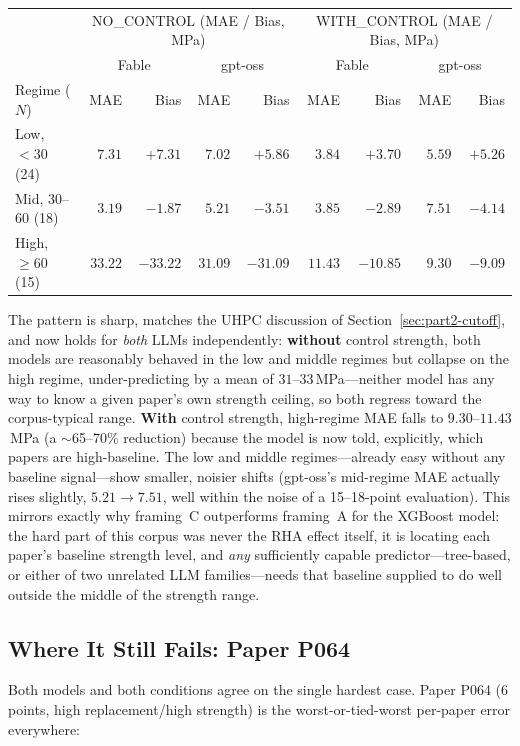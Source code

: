\documentclass[11pt]{article}
\begin{document}
\begin{center}\footnotesize
\begin{tabular}{lrrrrrrrr}
\toprule
& \multicolumn{4}{c}{NO\_CONTROL (MAE / Bias, MPa)} & \multicolumn{4}{c}{WITH\_CONTROL (MAE / Bias, MPa)} \\
& \multicolumn{2}{c}{Fable} & \multicolumn{2}{c}{gpt-oss} & \multicolumn{2}{c}{Fable} & \multicolumn{2}{c}{gpt-oss} \\
Regime ($N$) & MAE & Bias & MAE & Bias & MAE & Bias & MAE & Bias \\
\midrule
Low, $<30$ (24) & $7.31$ & $+7.31$ & $7.02$ & $+5.86$ & $3.84$ & $+3.70$ & $5.59$ & $+5.26$ \\
Mid, $30$--$60$ (18) & $3.19$ & $-1.87$ & $5.21$ & $-3.51$ & $3.85$ & $-2.89$ & $7.51$ & $-4.14$ \\
High, $\geq60$ (15) & $33.22$ & $-33.22$ & $31.09$ & $-31.09$ & $\mathbf{11.43}$ & $-10.85$ & $\mathbf{9.30}$ & $-9.09$ \\
\bottomrule
\end{tabular}
\end{center}

\noindent The pattern is sharp, matches the UHPC discussion of
Section~\ref{sec:part2-cutoff}, and now holds for \emph{both} LLMs independently:
\textbf{without} control strength, both models are reasonably behaved in the low and
middle regimes but collapse on the high regime, under-predicting by a mean of
$31$--$33$\,MPa---neither model has any way to know a given paper's own strength
ceiling, so both regress toward the corpus-typical range. \textbf{With} control
strength, high-regime MAE falls to $9.30$--$11.43$\,MPa (a $\sim$65--70\% reduction)
because the model is now told, explicitly, which papers are high-baseline. The low and
middle regimes---already easy without any baseline signal---show smaller, noisier
shifts (gpt-oss's mid-regime MAE actually rises slightly, $5.21\to7.51$, well within the
noise of a 15--18-point evaluation). This mirrors exactly why framing~C outperforms
framing~A for the XGBoost model: the hard part of this corpus was never the RHA effect
itself, it is locating each paper's baseline strength level, and \emph{any} sufficiently
capable predictor---tree-based, or either of two unrelated LLM families---needs that
baseline supplied to do well outside the middle of the strength range.

\subsection{Where It Still Fails: Paper P064}
Both models and both conditions agree on the single hardest case. Paper P064 (6 points,
high replacement/high strength) is the worst-or-tied-worst per-paper error everywhere:
\end{document}
